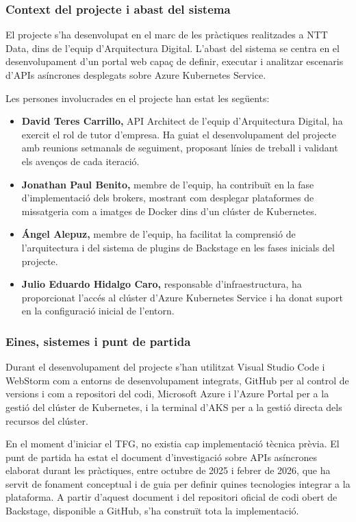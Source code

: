 \documentclass[11pt,a4paper]{article}
\begin{document}
\subsubsection{Context del projecte i abast del sistema}
El projecte s'ha desenvolupat en el marc de les pr\`actiques realitzades a NTT Data, dins de l'equip d'Arquitectura Digital. L'abast del sistema se centra en el desenvolupament d'un portal web capa\c{c} de definir, executar i analitzar escenaris d'APIs as\'incrones desplegats sobre Azure Kubernetes Service.

Les persones involucrades en el projecte han estat les seg\"uents:

\begin{itemize}
  \item \textbf{David Teres Carrillo,} API Architect de l'equip d'Arquitectura Digital, ha exercit el rol de tutor d'empresa. Ha guiat el desenvolupament del projecte amb reunions setmanals de seguiment, proposant l\'inies de treball i validant els aven\c{c}os de cada iteraci\'o.
  \item \textbf{Jonathan Paul Benito,} membre de l'equip, ha contribu\"it en la fase d'implementaci\'o dels brokers, mostrant com desplegar plataformes de missatgeria com a imatges de Docker dins d'un cl\'uster de Kubernetes.
  \item \textbf{\'Angel Alepuz,} membre de l'equip, ha facilitat la comprensi\'o de l'arquitectura i del sistema de plugins de Backstage en les fases inicials del projecte.
  \item \textbf{Julio Eduardo Hidalgo Caro,} responsable d'infraestructura, ha proporcionat l'acc\'es al cl\'uster d'Azure Kubernetes Service i ha donat suport en la configuraci\'o inicial de l'entorn.
\end{itemize}

\subsubsection{Eines, sistemes i punt de partida}
Durant el desenvolupament del projecte s'han utilitzat Visual Studio Code i WebStorm com a entorns de desenvolupament integrats, GitHub per al control de versions i com a repositori del codi, Microsoft Azure i l'Azure Portal per a la gesti\'o del cl\'uster de Kubernetes, i la terminal d'AKS per a la gesti\'o directa dels recursos del cl\'uster.

En el moment d'iniciar el TFG, no existia cap implementaci\'o t\`ecnica pr\`evia. El punt de partida ha estat el document d'investigaci\'o sobre APIs as\'incrones elaborat durant les pr\`actiques, entre octubre de 2025 i febrer de 2026, que ha servit de fonament conceptual i de guia per definir quines tecnologies integrar a la plataforma. A partir d'aquest document i del repositori oficial de codi obert de Backstage, disponible a GitHub, s'ha constru\"it tota la implementaci\'o.
\end{document}
